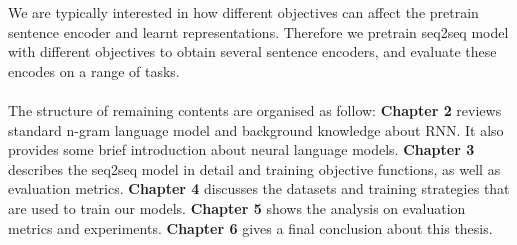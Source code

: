 We are typically interested in how different objectives can affect the pretrain sentence encoder and learnt representations. 
Therefore we pretrain seq2seq model with different objectives to obtain several sentence encoders, and evaluate these encodes on a range of tasks. \\\\
The structure of remaining contents are organised as follow:
\textbf{Chapter 2} reviews standard n-gram language model and background knowledge about RNN. It also provides some brief introduction about neural language models. 
\textbf{Chapter 3} describes the seq2seq model in detail and training objective functions, as well as evaluation metrics.
\textbf{Chapter 4} discusses the datasets and training strategies that are used to train our models.
\textbf{Chapter 5} shows the analysis on evaluation metrics and experiments.
\textbf{Chapter 6} gives a final conclusion about this thesis.
